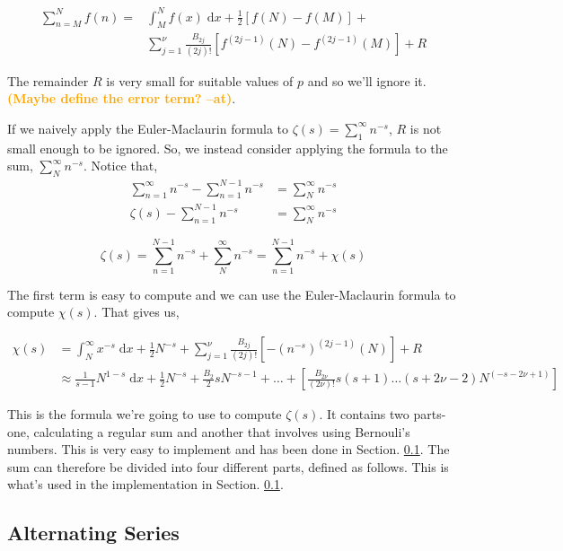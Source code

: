 \documentclass{amsproc}
\newcommand{\be}{\begin{equation}}
\newcommand{\ee}{\end{equation}}
\newcommand{\df}{\; \mathrm{d}}
\newcommand{\at}[1]{\textbf{\textcolor{orange}{(#1 --at)}}}
\theoremstyle{definition}
\theoremstyle{remark}
\numberwithin{equation}{section}
\begin{document}
\begin{align}
\sum_{n = M}^{N} f(n) = &\int_M^N f(x) \df x + \frac{1}{2} \left[ f(N) - f(M) \right] + \\
&\sum_{j = 1}^{\nu} \frac{B_{2j}}{ (2j)! } \left[ f^{( 2j - 1)}(N) - f^{(2j - 1)} (M) \right] + R
\end{align}

The remainder $R$ is very small for suitable values of $p$ and so we'll ignore it. \at{Maybe define the error term?}. 

If we naively apply the Euler-Maclaurin formula to $\zeta(s) = \sum_{1}^{\infty} n^{-s}$, $R$ is not small enough to be ignored. So, we instead consider applying the formula to the sum, $\sum_{N}^{\infty} n^{-s}$. Notice that,
\begin{align*}
 \sum_{n = 1}^{\infty} n^{-s} - \sum_{n = 1}^{N - 1} n^{-s} &= \sum_{N}^{\infty} n^{-s} \\
 \zeta(s) - \sum_{n = 1}^{N - 1} n^{-s} &= \sum_{N}^{\infty} n^{-s} 
\end{align*}

\be
\label{eqn:euler_main}
\zeta(s)  = \sum_{n = 1}^{N - 1} n^{-s} + \sum_{N}^{\infty} n^{-s} = \sum_{n = 1}^{N - 1} n^{-s} + \chi(s)
\ee

The first term is easy to compute and we can use the Euler-Maclaurin formula to compute $\chi(s)$. That gives us,

\begin{align*}
\chi(s) &= \int_N^{\infty} x^{-s} \df x + \frac{1}{2} N^{-s} + \sum_{j = 1}^{\nu} \frac{B_{2j}}{ (2j)! } \left[ - (n^{-s})^{(2j - 1)} (N) \right] + R \\
& \approx \frac{1}{s - 1} N^{1 - s} \df x + \frac{1}{2} N^{-s} + \frac{B_2}{2} s N^{-s - 1} + \ldots + \left[ \frac{B_{2 \nu}}{ (2\nu)! } s(s + 1)  \ldots (s + 2 \nu - 2) N^{( -s - 2\nu + 1)} \right]
\end{align*}

This is the formula we're going to use to compute $\zeta(s)$. It contains two parts- one, calculating a regular sum and another that involves using Bernouli's numbers. This is very easy to implement and has been done in Section. \ref{}. The sum can therefore be divided into four different parts, defined as follows. This is what's used in the implementation in Section. \ref{}.

\subsection{Alternating Series}
\end{document}
